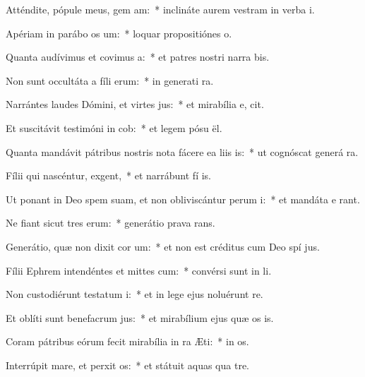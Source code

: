 \item Atténdite, pópule meus, gem am:~* inclináte aurem vestram in verba  i.
\item Apériam in parábo os um:~* loquar propositiónes  o.
\item Quanta audívimus et covimus a:~* et patres nostri narra bis.
\item Non sunt occultáta a fíli erum:~* in generati ra.
\item Narrántes laudes Dómini, et virtes jus:~* et mirabília e,  cit.
\item Et suscitávit testimóni in cob:~* et legem pósu  ël.
\item Quanta mandávit pátribus nostris nota fácere ea liis is:~* ut cognóscat generá ra.
\item Fílii qui nascéntur,  exgent,~* et narrábunt fí is.
\item Ut ponant in Deo spem suam, et non obliviscántur perum i:~* et mandáta e rant.
\item Ne fiant sicut tres erum:~* generátio prava  rans.
\item Generátio, quæ non dixit cor um:~* et non est créditus cum Deo spí jus.
\item Fílii Ephrem intendéntes et mittes cum:~* convérsi sunt in  li.
\item Non custodiérunt testatum i:~* et in lege ejus noluérunt re.
\item Et oblíti sunt benefacrum jus:~* et mirabílium ejus quæ os is.
\item Coram pátribus eórum fecit mirabília in ra Æti:~* in  os.
\item Interrúpit mare, et perxit os:~* et státuit aquas qua  tre.
